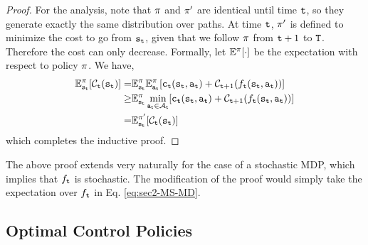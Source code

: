 \begin{proof}
For the analysis, note that $\pi$ and $\pi'$ are identical
until time ${\tt t}$, so they generate exactly the same distribution
over paths. At time ${\tt t}$, $\pi'$ is defined to minimize the
cost to go from ${\tt s}_{\tt t}$, given that we follow $\pi$ from
${\tt t}+1$ to ${\tt T}$. Therefore the cost can only decrease.
Formally, let $\mathbb{E}^\pi[\cdot]$ be the expectation with respect to
policy $\pi$. We have,
\begin{align*}
\mathbb{E}^\pi_{{\tt s}_{\tt t}}[\mathcal{C}_{{\tt t}}({\tt s}_{\tt t})]
= & \mathbb{E}^\pi_{{\tt s}_{\tt t}}
\mathbb{E}^\pi_{{\tt a}_{\tt t}}[{\tt c}_{{\tt t}}({\tt s}_{\tt t},{\tt a}_{\tt t})+\mathcal{C}_{{\tt t}+1}(f_{\tt t}({\tt s}_{\tt t},{\tt a}_{\tt t}))]\\
\geq & \mathbb{E}^\pi_{{\tt s}_{\tt t}} \min_{{\tt a}_{\tt t}\in
\mathcal{A}_{\tt t}}[{\tt c}_{{\tt t}}({\tt s}_{\tt t},{\tt a}_{\tt t})+\mathcal{C}_{{\tt t}+1}(f_{\tt t}({\tt s}_{\tt t},{\tt a}_{\tt t}))]\\
= & \mathbb{E}^{\pi'}_{{\tt s}_{\tt t}} [\mathcal{C}_{\tt t} ({\tt s}_{\tt t})]
\end{align*}
which completes the inductive proof.
%
\end{proof}

\begin{remark}
The above proof extends very naturally for the case of a stochastic
MDP, which implies that $f_{\tt t}$ is stochastic. The modification
of the proof would simply take the expectation over $f_{\tt t}$ in
Eq. \ref{eq:sec2-MS-MD}.
\end{remark}



\subsection{Optimal Control Policies}

